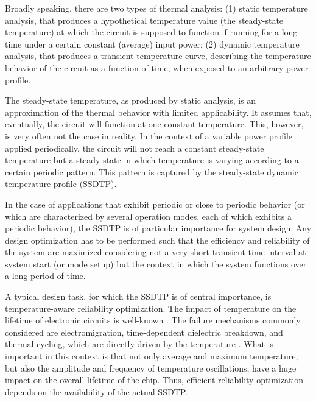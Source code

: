 Broadly speaking, there are two types of thermal analysis: (1) static
temperature analysis, that produces a hypothetical temperature value (the
steady-state temperature) at which the circuit is supposed to function if
running for a long time under a certain constant (average) input power; (2)
dynamic temperature analysis, that produces a transient temperature curve,
describing the temperature behavior of the circuit as a function of time, when
exposed to an arbitrary power profile.

The steady-state temperature, as produced by static analysis, is an
approximation of the thermal behavior with limited applicability. It assumes
that, eventually, the circuit will function at one constant temperature.  This,
however, is very often not the case in reality. In the context of a variable
power profile applied periodically, the circuit will not reach a constant
steady-state temperature but a steady state in which temperature is varying
according to a certain periodic pattern. This pattern is captured by the
steady-state dynamic temperature profile (SSDTP).

In the case of applications that exhibit periodic or close to periodic behavior
(or which are characterized by several operation modes, each of which exhibits a
periodic behavior), the SSDTP is of particular importance for system design. Any
design optimization has to be performed such that the efficiency and reliability
of the system are maximized considering not a very short transient time interval
at system start (or mode setup) but the context in which the system functions
over a long period of time.

A typical design task, for which the SSDTP is of central importance, is
temperature-aware reliability optimization. The impact of temperature on the
lifetime of electronic circuits is well-known \cite{srinivasan2004, coskun2006,
xiang2010, jedec2010}. The failure mechanisms commonly considered are
electromigration, time-dependent dielectric breakdown, and thermal cycling,
which are directly driven by the temperature \cite{jedec2010}. What is important
in this context is that not only average and maximum temperature, but also the
amplitude and frequency of temperature oscillations, have a huge impact on the
overall lifetime of the chip. Thus, efficient reliability optimization depends
on the availability of the actual SSDTP.

